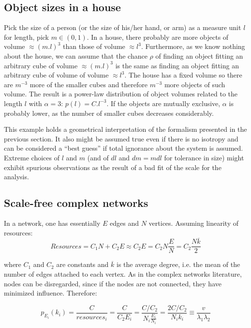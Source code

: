 \documentclass[a4paper, 11pt]{article} %
\begin{document}
\subsection{Object sizes in a house}\label{sec:siz}
Pick the size of a person (or the size of his/her hand, or  arm)
as a measure unit $l$ for length, pick $m \in (0,1)$.
In a house, there probably are more objects
of volume $\approx (m.l)^3$ 
than those of volume $\approx l^3$.
Furthermore, as we know nothing about the house,
we can assume that the chance $\rho$ of finding an object
fitting an arbitrary cube of volume $\approx (m.l)^3$
is the same as finding an object fitting an
arbitrary cube of volume of volume $\approx l^3$.
The house has a fixed volume so there are $m^{-3}$ more of
the smaller cubes and therefore $m^{-3}$ more objects of such
volume. 
The result is a power-law distribution of object volumes
related to the length $l$ with $\alpha=3$:
$p(l)=C.l^{-3}$.
If the objects are mutually exclusive,
$\alpha$ is probably lower, as the number of smaller
cubes decreases considerably.

This example holds a geometrical
interpretation of the formalism presented in the previous section.
It also might be assumed true even if there is no isotropy
and can be considered a ``best guess'' if total ignorance
about the system is assumed. 
Extreme choices of $l$ and $m$ (and of $dl$ and $dm=mdl$ for tolerance in size)
might exhibit spurious observations
as the result of a bad fit of the scale for the analysis.

\subsection{Scale-free complex networks}

In a network, one has essentially $E$ edges and $N$ vertices.
Assuming linearity of resources:
\begin{equation}\label{eq:nre}
	Resources=C_1 N + C_2 E \approx C_2 E = C_2 N \frac{E}{N} = C_2 \frac{N \overline{k}}{2}
\end{equation}

\noindent where $C_1$ and $C_2$ are constants and $\overline{k}$ is
the average degree, i.e. the mean of the number of edges attached to each vertex.
As in the complex networks literature, nodes can be disregarded, since if the nodes
are not connected, they have minimized influence.
Therefore:

\begin{equation}\label{eq:eqf}
	p_{E_i}(k_i)=\frac{C}{resources_i}=\frac{C}{C_2 E_i}=\frac{C/C_2}{N_i \frac{E_i}{N_i}}=\frac{2C/C_2}{N_i k_i} \equiv \frac{v}{\lambda_1   \lambda_2}
\end{equation}
\end{document}
